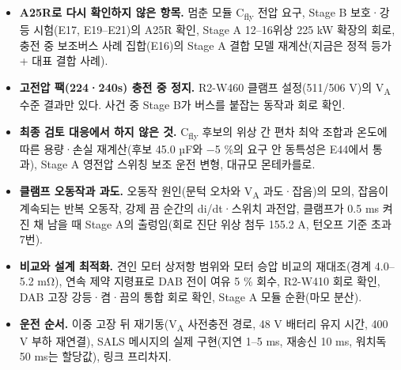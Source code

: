\begin{itemize}
\item \textbf{A25R로 다시 확인하지 않은 항목.} 멈춘 모듈 C\textsubscript{fly} 전압 요구, Stage B 보호·강등 시험(E17, E19–E21)의 A25R 확인, Stage A 12–16위상 225 kW 확장의 회로, 충전 중 보조버스 사례 집합(E16)의 Stage A 결합 모델 재계산(지금은 정적 등가 + 대표 결합 사례).
\item \textbf{고전압 팩(224·240s) 충전 중 정지.} R2-W460 클램프 설정(511/506 V)의 V\textsubscript{A} 수준 결과만 있다. 사건 중 Stage B가 버스를 붙잡는 동작과 회로 확인.
\item \textbf{최종 검토 대응에서 하지 않은 것.} C\textsubscript{fly} 후보의 위상 간 편차 최악 조합과 온도에 따른 용량·손실 재계산(후보 45.0 µF와 −5 \%의 요구 안 동특성은 E44에서 통과), Stage A 영전압 스위칭 보조 운전 변형, 대규모 몬테카를로.
\item \textbf{클램프 오동작과 과도.} 오동작 원인(문턱 오차와 V\textsubscript{A} 과도·잡음)의 모의, 잡음이 계속되는 반복 오동작, 강제 끔 순간의 di/dt·스위치 과전압, 클램프가 0.5 ms 켜진 채 남을 때 Stage A의 출렁임(회로 진단 위상 첨두 155.2 A, 턴오프 기준 초과 7번).
\item \textbf{비교와 설계 최적화.} 견인 모터 상저항 범위와 모터 승압 비교의 재대조(경계 4.0–5.2 mΩ), 연속 제약 지령표로 DAB 전이 여유 5 \% 회수, R2-W410 회로 확인, DAB 고장 강등·켬·끔의 통합 회로 확인, Stage A 모듈 순환(마모 분산).
\item \textbf{운전 순서.} 이중 고장 뒤 재기동(V\textsubscript{A} 사전충전 경로, 48 V 배터리 유지 시간, 400 V 부하 재연결), SALS 메시지의 실제 구현(지연 1–5 ms, 재송신 10 ms, 워치독 50 ms는 할당값), 링크 프리차지.
\end{itemize}
